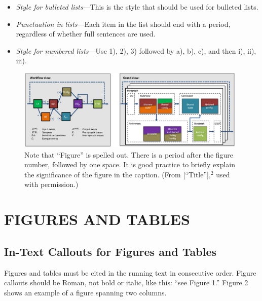 \documentclass{IEEEcsmag}
\begin{document}
\begin{itemize}
\item[{\ieeeguilsinglright}] {\it Style for bulleted lists}---This is the style that should be used for bulleted lists.
	
\item[{\ieeeguilsinglright}] {\it Punctuation in lists}---Each item in the list should end with a period, regardless of whether full sentences are used.

\item[{\ieeeguilsinglright}] {\it Style for numbered lists}---Use 1), 2), 3) followed by a), b), c), and then i), ii), iii).

\end{itemize}\vspace*{3pt}




\begin{figure}
\centerline{\includegraphics[width=26pc]{fig2.jpg}}
\caption{Note that ``Figure'' is spelled out. There is a period after the figure number, followed by one space. It is good practice to briefly explain the significance of the figure in the caption. (From [``Title''],$^2$ used with permission.)}\vspace*{-5pt}
\end{figure}




\section{FIGURES AND TABLES}

\subsection{In-Text Callouts for Figures and Tables}

Figures and tables must be cited in the running text in consecutive order. Figure callouts should be Roman, not bold or italic, like this: ``see Figure 1.'' Figure 2 shows an example of a figure spanning two columns.
\end{document}
